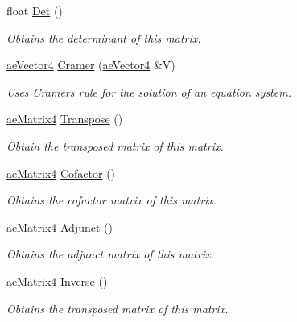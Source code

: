 \begin{DoxyCompactItemize}
\item 
float \hyperlink{structae_core_1_1ae_matrix4_a66ecc876f5c1f8c783867b79bdd27bb4}{Det} ()
\begin{DoxyCompactList}\small\item\em Obtains the determinant of this matrix. \end{DoxyCompactList}\item 
\hyperlink{structae_core_1_1ae_vector4}{ae\+Vector4} \hyperlink{structae_core_1_1ae_matrix4_ab9cd1ee80548a2808c66bf14fba154ca}{Cramer} (\hyperlink{structae_core_1_1ae_vector4}{ae\+Vector4} \&V)
\begin{DoxyCompactList}\small\item\em Uses Cramer\textquotesingle{}s rule for the solution of an equation system. \end{DoxyCompactList}\item 
\hyperlink{structae_core_1_1ae_matrix4}{ae\+Matrix4} \hyperlink{structae_core_1_1ae_matrix4_aa60fdbb4e8aaee50b6b523d14daac04c}{Transpose} ()
\begin{DoxyCompactList}\small\item\em Obtain the transposed matrix of this matrix. \end{DoxyCompactList}\item 
\hyperlink{structae_core_1_1ae_matrix4}{ae\+Matrix4} \hyperlink{structae_core_1_1ae_matrix4_a65c661fefd2309107ae0a06d9efa1eb6}{Cofactor} ()
\begin{DoxyCompactList}\small\item\em Obtains the cofactor matrix of this matrix. \end{DoxyCompactList}\item 
\hyperlink{structae_core_1_1ae_matrix4}{ae\+Matrix4} \hyperlink{structae_core_1_1ae_matrix4_aecda988bbd18537203d1986bff096e00}{Adjunct} ()
\begin{DoxyCompactList}\small\item\em Obtains the adjunct matrix of this matrix. \end{DoxyCompactList}\item 
\hyperlink{structae_core_1_1ae_matrix4}{ae\+Matrix4} \hyperlink{structae_core_1_1ae_matrix4_a88a756b1095a01b04ac70f1d731bb51b}{Inverse} ()
\begin{DoxyCompactList}\small\item\em Obtains the transposed matrix of this matrix. \end{DoxyCompactList}\end{DoxyCompactItemize}
